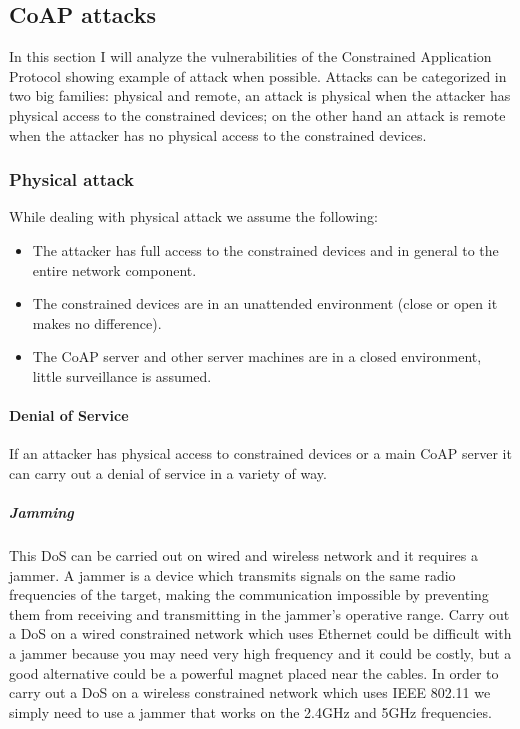	\subsection{CoAP attacks}
	
	In this section I will analyze the vulnerabilities of the Constrained Application Protocol showing example of attack when possible.\newline
	Attacks can be categorized in two big families: physical and remote, an attack is physical when the attacker has physical access to the constrained devices;
	on the other hand an attack is remote when the attacker has no physical access to the constrained devices.\newline
	
	\subsubsection{Physical attack}
	While dealing with physical attack we assume the following:
	\begin{itemize}
		\item The attacker has full access to the constrained devices and in general to the entire network component.
		\item The constrained devices are in an unattended environment (close or open it makes no difference).
		\item The CoAP server and other server machines are in a closed environment, little surveillance is assumed.
	\end{itemize}
	
	\paragraph{Denial of Service}
	If an attacker has physical access to constrained devices or a main CoAP server it can carry out a denial of service in a variety of way.\newline
	
	\subparagraph{Jamming}
	This DoS can be carried out on wired and wireless network and it requires a jammer.\newline
	A jammer is a device which transmits signals on the same radio frequencies of the target, making the communication impossible by preventing them from receiving and transmitting in the jammer’s operative range.\newline
	Carry out a DoS on a wired constrained network which uses Ethernet could be difficult with a jammer because you may need very high frequency and it could be costly, but a good alternative could be a powerful magnet placed near the cables.\newline
	In order to carry out a DoS on a wireless constrained network which uses IEEE 802.11 we simply need to use a jammer that works on the 2.4GHz and 5GHz frequencies.\newline
	
